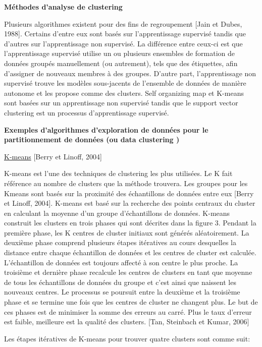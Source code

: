\documentclass[12pt]{article}
\begin{document}
{\textbf{Méthodes d'analyse de clustering}

Plusieurs algorithmes existent pour des fins de regroupement {\color{red}[Jain et Dubes, 1988]}. Certains d'entre eux sont basés sur l'apprentissage supervisé tandis que d'autres sur l'apprentissage non supervisé. La différence entre ceux-ci est que l'apprentissage supervisé utilise un ou plusieurs ensembles de formation de données groupés manuellement (ou autrement), tels que des étiquettes, afin d'assigner de nouveaux membres à des groupes. D'autre part, l'apprentissage non supervisé trouve les modèles sous-jacents de l'ensemble de données de manière autonome et les propose comme des clusters. Self organizing map et K-means sont basées sur un apprentissage non supervisé tandis que le support vector clustering est un processus d'apprentissage supervisé.

\textbf{Exemples d'algorithmes d'exploration de données pour le partitionnement de données (ou data clustering )}

\underline{K-means} {\color{red}[Berry et Linoff, 2004]}

K-means est l'une des techniques de clustering les plus utilisées. Le K fait référence au nombre de clusters que la méthode trouvera. Les groupes pour les Kmeans sont basés sur la proximité des échantillons de données entre eux  {\color{red}[Berry et Linoff, 2004]}.
K-means est basé sur la recherche des points centraux du cluster en calculant la moyenne d'un groupe d'échantillons de données. K-means construit les clusters en trois phases qui sont décrites dans la figure 3. Pendant la première phase, les K centres de cluster initiaux sont générés aléatoirement. La deuxième phase comprend plusieurs étapes itératives au cours desquelles la distance entre chaque échantillon de données et les centres de cluster est calculée. L'échantillon de données est toujours affecté à son centre le plus proche. La troisième et dernière phase recalcule les centres de clusters en tant que moyenne de tous les échantillons de données du groupe et c'est ainsi que naissent les nouveaux centres. Le processus se poursuit entre la deuxième et la troisième phase et se termine une fois que les centres de cluster ne changent plus. 
Le but de ces phases est de minimiser la somme des erreurs au carré. Plus le taux d'erreur est faible, meilleure est la qualité des clusters.  {\color{red}[Tan, Steinbach et Kumar, 2006]}


Les étapes itératives de K-means pour trouver quatre clusters sont comme suit:

}
\end{document}
